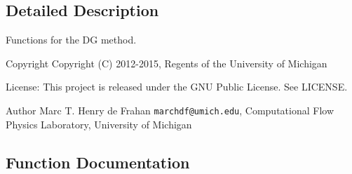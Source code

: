 \subsection{Detailed Description}
Functions for the D\-G method. \begin{DoxyCopyright}{Copyright}
Copyright (C) 2012-\/2015, Regents of the University of Michigan 
\end{DoxyCopyright}
\begin{DoxyParagraph}{License\-:}
This project is released under the G\-N\-U Public License. See L\-I\-C\-E\-N\-S\-E. 
\end{DoxyParagraph}
\begin{DoxyAuthor}{Author}
Marc T. Henry de Frahan {\tt marchdf@umich.\-edu}, Computational Flow Physics Laboratory, University of Michigan 
\end{DoxyAuthor}


\subsection{Function Documentation}

